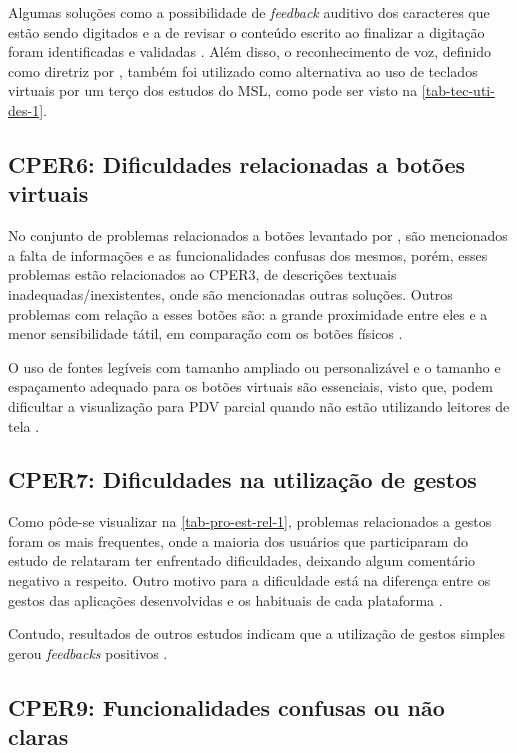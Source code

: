 Algumas soluções como a possibilidade de \emph{feedback} auditivo dos caracteres que estão sendo digitados e
a de revisar o conteúdo escrito ao finalizar a digitação foram identificadas e validadas \cite{Siebra2016, Duarte2017}.
Além disso, o reconhecimento de voz, definido como diretriz por , também foi
utilizado como alternativa ao uso de teclados virtuais por um terço dos estudos do MSL\@, como pode ser visto na \autoref{tab-tec-uti-des-1}.

\subsection{CPER6: Dificuldades relacionadas a botões virtuais}

No conjunto de problemas relacionados a botões levantado por , são mencionados a falta de informações
e as funcionalidades confusas dos mesmos, porém, esses problemas estão relacionados ao CPER3, de descrições textuais
inadequadas/inexistentes, onde são mencionadas outras soluções. Outros problemas com relação a esses botões são:
a grande proximidade entre eles e a menor sensibilidade tátil, em comparação com os botões físicos \cite{Damaceno2016}.

O uso de fontes legíveis com tamanho ampliado ou personalizável e o tamanho e espaçamento adequado para os botões virtuais
são essenciais, visto que, podem dificultar a visualização para PDV parcial quando não estão utilizando leitores
de tela \cite{Heesook2017,Kim20191103}.

\subsection{CPER7: Dificuldades na utilização de gestos}

Como pôde-se visualizar na \autoref{tab-pro-est-rel-1}, problemas relacionados a gestos foram os mais frequentes, onde a maioria dos usuários
que participaram do estudo de  relataram ter enfrentado dificuldades, deixando algum comentário negativo a respeito.
Outro motivo para a dificuldade está na diferença entre os gestos das aplicações desenvolvidas e os habituais de cada plataforma \cite{Leporini2017}.

Contudo, resultados de outros estudos indicam que a utilização de gestos simples gerou \emph{feedbacks} positivos \cite{Duarte2017,Ducci2018}.

\subsection{CPER9: Funcionalidades confusas ou não claras}

